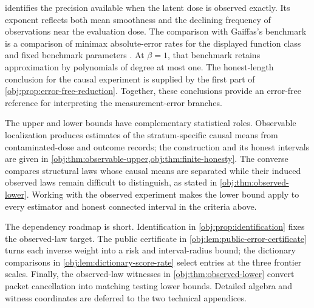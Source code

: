 
 identifies the precision available when the latent dose is observed exactly. Its exponent reflects both mean smoothness and the declining frequency of observations near the evaluation dose. The comparison with Gaiffas's benchmark is a comparison of minimax absolute-error rates for the displayed function class and fixed benchmark parameters \citep[Definition 2 and Theorem 1, equations (2.1), (2.4), and (2.5), pp.~3--4]{Gaiffas2005}. At \(\beta=1\), that benchmark retains approximation by polynomials of degree at most one. The honest-length conclusion for the causal experiment is supplied by the first part of \cref{obj:prop:error-free-reduction}. Together, these conclusions provide an error-free reference for interpreting the measurement-error branches.

The upper and lower bounds have complementary statistical roles. Observable localization produces estimates of the stratum-specific causal means from contaminated-dose and outcome records; the construction and its honest intervals are given in \cref{obj:thm:observable-upper,obj:thm:finite-honesty}. The converse compares structural laws whose causal means are separated while their induced observed laws remain difficult to distinguish, as stated in \cref{obj:thm:observed-lower}. Working with the observed experiment makes the lower bound apply to every estimator and honest connected interval in the criteria above.

The dependency roadmap is short. Identification in \cref{obj:prop:identification} fixes the observed-law target. The public certificate in \cref{obj:lem:public-error-certificate} turns each inverse weight into a risk and interval-radius bound; the dictionary comparisons in \cref{obj:lem:dictionary-score-rate} select entries at the three frontier scales. Finally, the observed-law witnesses in \cref{obj:thm:observed-lower} convert packet cancellation into matching testing lower bounds. Detailed algebra and witness coordinates are deferred to the two technical appendices.

